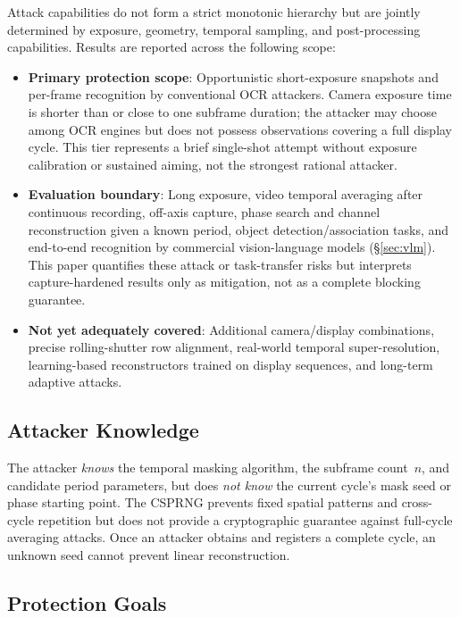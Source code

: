 \documentclass{ieeeaccess}
\begin{document}
Attack capabilities do not form a strict monotonic hierarchy but are jointly determined by exposure, geometry, temporal sampling, and post-processing capabilities. Results are reported across the following scope:
\begin{itemize}
\item \textbf{Primary protection scope}: Opportunistic short-exposure snapshots and per-frame recognition by conventional OCR attackers. Camera exposure time is shorter than or close to one subframe duration; the attacker may choose among OCR engines but does not possess observations covering a full display cycle. This tier represents a brief single-shot attempt without exposure calibration or sustained aiming, not the strongest rational attacker.
\item \textbf{Evaluation boundary}: Long exposure, video temporal averaging after continuous recording, off-axis capture, phase search and channel reconstruction given a known period, object detection/association tasks, and end-to-end recognition by commercial vision-language models (\S\ref{sec:vlm}). This paper quantifies these attack or task-transfer risks but interprets capture-hardened results only as mitigation, not as a complete blocking guarantee.
\item \textbf{Not yet adequately covered}: Additional camera/display combinations, precise rolling-shutter row alignment, real-world temporal super-resolution, learning-based reconstructors trained on display sequences, and long-term adaptive attacks.
\end{itemize}

\subsection{Attacker Knowledge}

The attacker \emph{knows} the temporal masking algorithm, the subframe count~$n$, and candidate period parameters, but does \emph{not know} the current cycle's mask seed or phase starting point. The CSPRNG prevents fixed spatial patterns and cross-cycle repetition but does not provide a cryptographic guarantee against full-cycle averaging attacks. Once an attacker obtains and registers a complete cycle, an unknown seed cannot prevent linear reconstruction.

\subsection{Protection Goals}
\end{document}
